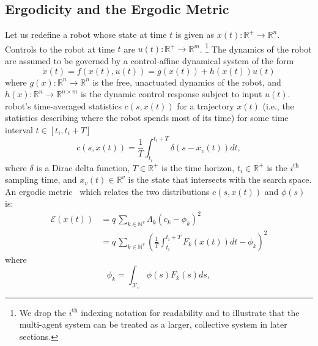 \documentclass[letterpaper, 10 pt, conference]{ieeeconf}  %
\begin{document}
\subsection{Ergodicity and the Ergodic Metric}
\label{subsec:ergodicity-and-the-ergodic-metric}
Let us redefine a robot whose state at time $t$ is given as $x(t) : \mathbb{R}^+ \to \mathbb{R}^n$. 
Controls to the robot at time $t$ are $u(t) : \mathbb{R}^+ \to \mathbb{R}^m$. \footnote{We drop the $i^\text{th}$ indexing notation for readability and to illustrate that the multi-agent system can be treated as a larger, collective system in later sections.}
The dynamics of the robot are assumed to be governed by a control-affine dynamical system of the form
\begin{equation} \label{eq:robot_dynamics}
\dot{x}(t) = f(x(t),u(t)) = g(x(t)) + h(x(t)) u(t)
\end{equation}
where $g(x) : \mathbb{R}^n \to \mathbb{R}^n$ is the free, unactuated dynamics of the robot, and $h(x): \mathbb{R}^n \to \mathbb{R}^{n \times m}$ is the dynamic control response subject to input $u(t)$.
  robot's time-averaged statistics $c(s, x(t))$ for a trajectory $x(t)$ (i.e., the statistics describing where the robot spends most of its time) for some time interval $t \in \left[ t_i, t_i + T\right]$ 
\begin{equation}\label{eq:time_avg_stats}
c(s, x(t)) = \frac{1}{T}\int_{t_i}^{t_i+T} \delta (s - x_v(t)) dt,
\end{equation}
where $\delta$ is a Dirac delta function, $T \in \mathbb{R}^+$ is the time horizon, $t_i \in \mathbb{R}^+$ is the $i^\text{th}$ sampling time, and $x_v(t) \in \mathbb{R}^v$ is the state that intersects with the search space.
An ergodic metric~\cite{mathew2011metrics} which relates the two distributions $c(s,x(t))$ and $\phi(s)$ is:
\begin{align} \label{eq:ergodic_metric}
\mathcal{E}(x(t)) & = q \,\sum_{k \in \mathbb{N}^v} \Lambda_k \left(c_k -\phi_k \right)^2   \\
& = q \, \sum_{k \in \mathbb{N}^v} \left( \frac{1}{T} \int_{t_i}^{t_i + T} F_k(x(t)) dt - \phi_k \right)^2 \nonumber
\end{align}
where
\begin{equation*}
\phi_k =  \int_{\mathcal{X}_v} \phi(s) F_k(s) ds, 
\end{equation*} 
\end{document}
